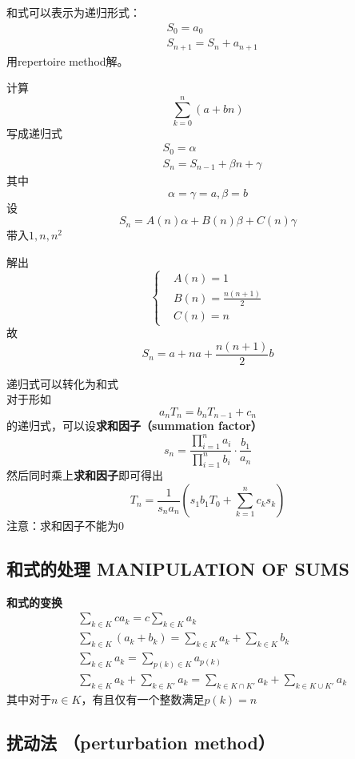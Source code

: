 和式可以表示为递归形式：
$$
\begin{aligned}
&S_0=a_0\\
&S_{n+1}=S_{n}+a_{n+1}
\end{aligned}
$$
用repertoire method解。\\
\begin{example}
  计算
$$
\sum_{k=0}^{n}(a+bn)
$$
写成递归式
$$
\begin{aligned}
&S_0=\alpha\\
&S_n=S_{n-1}+\beta n+\gamma
\end{aligned}
$$
其中
$$
\alpha=\gamma=a,\beta =b
$$
设
$$
S_n=A(n) \alpha +B(n) \beta+C(n) \gamma
$$
带入$1,n,n^2$

解出
$$
\begin{cases}
&A(n)=1\\
&B(n)=\frac{n(n+1)}{2}\\
&C(n)=n
\end{cases}
$$
故
$$
S_n=a+na+\frac{n(n+1)}{2}b
$$
\end{example}

递归式可以转化为和式\\

对于形如
$$
a_nT_n=b_nT_{n-1}+c_n
$$
的递归式，可以设\textbf{求和因子（summation factor）}
$$
s_n=\frac{\prod\limits_{i=1}^{n}a_i}{\prod\limits_{i=1}^{n}b_i}\cdot\frac{b_1}{a_n}
$$
然后同时乘上\textbf{求和因子}即可得出
$$
T_n=\frac{1}{s_na_n}\left(s_1b_1T_0+\sum_{k=1}^{n}c_ks_k \right)
$$
注意：求和因子不能为0

\subsection{和式的处理 MANIPULATION OF SUMS}

\textbf{和式的变换}
$$
\begin{aligned}
&\sum_{k\in K}c a_k=c\sum_{k\in K}a_k\\
&\sum_{k\in K}(a_k+b_k)=\sum_{k \in K}a_k +\sum_{k \in K}b_k\\
&\sum_{k\in K} a_k =\sum_{p(k) \in K} a_{p(k)}\\
&\sum_{k\in K }a_k +\sum_{k\in K'} a_k=\sum_{k\in K\cap K'}a_k + \sum_{k\in K\cup K'} a_k
\end{aligned}
$$
其中对于$n\in K$，有且仅有一个整数满足$p(k)=n$\\

\subsection{扰动法 （perturbation method）}

